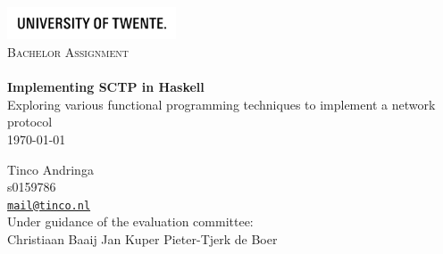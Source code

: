 \begin{titlepage}

\begin{center}

\includegraphics[width=50mm]{UT_Logo_Black_EN.jpg}\\[1.5cm]
\textsc{\Large Bachelor Assignment}\\[0.5cm]
\HRule \\[0.4cm]
{ \huge \bfseries Implementing SCTP in Haskell}\\[0.4cm]
{\large Exploring various functional programming techniques to implement a network protocol}
\HRule \\[1.5cm]
{\large \today}
\vfill
\begin{minipage}{0.4\textwidth}
\center
Tinco Andringa\\
s0159786\\
\href{mailto:mail@tinco.nl}{\nolinkurl{mail@tinco.nl}} \\[0.5cm]
\vfill
Under guidance of the evaluation committee: \\[0.25cm]
Christiaan Baaij
\vfill
Jan Kuper
\vfill
Pieter-Tjerk de Boer


\begin{flushleft} \large
\end{flushleft}
\end{minipage}
\end{center}
\end{titlepage}
